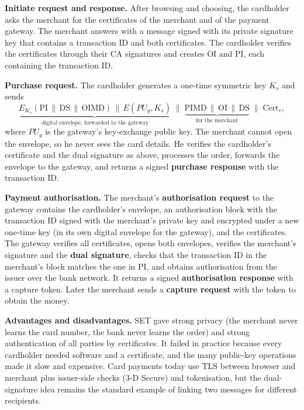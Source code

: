 \textbf{Initiate request and response.} After browsing and choosing, the cardholder asks the merchant for the certificates of the merchant and of the payment gateway. The merchant answers with a message signed with its private signature key that contains a transaction ID and both certificates. The cardholder verifies the certificates through their CA signatures and creates OI and PI, each containing the transaction ID.

\textbf{Purchase request.} The cardholder generates a one-time symmetric key $K_s$ and sends
\[
\underbrace{E_{K_s}(\mathrm{PI} \,\|\, \mathrm{DS} \,\|\, \mathrm{OIMD}) \,\|\, E(PU_{g}, K_s)}_{\text{digital envelope, forwarded to the gateway}} \;\|\; \underbrace{\mathrm{PIMD} \,\|\, \mathrm{OI} \,\|\, \mathrm{DS}}_{\text{for the merchant}} \;\|\; \mathrm{Cert}_c ,
\]
where $PU_g$ is the gateway's key-exchange public key. The merchant cannot open the envelope, so he never sees the card details. He verifies the cardholder's certificate and the dual signature as above, processes the order, forwards the envelope to the gateway, and returns a signed \textbf{purchase response} with the transaction ID.

\textbf{Payment authorisation.} The merchant's \textbf{authorisation request} to the gateway contains the cardholder's envelope, an authorisation block with the transaction ID signed with the merchant's private key and encrypted under a new one-time key (in its own digital envelope for the gateway), and the certificates. The gateway verifies all certificates, opens both envelopes, verifies the merchant's signature and the \textbf{dual signature}, checks that the transaction ID in the merchant's block matches the one in PI, and obtains authorisation from the issuer over the bank network. It returns a signed \textbf{authorisation response} with a capture token. Later the merchant sends a \textbf{capture request} with the token to obtain the money.

\textbf{Advantages and disadvantages.} SET gave strong privacy (the merchant never learns the card number, the bank never learns the order) and strong authentication of all parties by certificates. It failed in practice because every cardholder needed software and a certificate, and the many public-key operations made it slow and expensive. Card payments today use TLS between browser and merchant plus issuer-side checks (3-D Secure) and tokenisation, but the dual-signature idea remains the standard example of linking two messages for different recipients.


